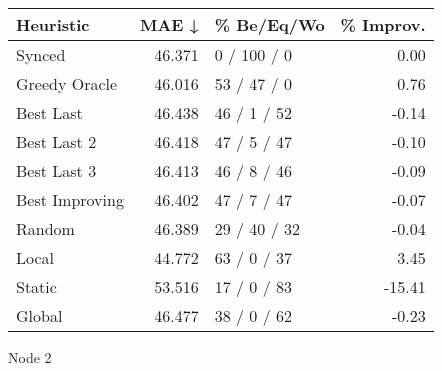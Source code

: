 \begin{tabular}{lrlr}
\toprule
\textbf{Heuristic} & \textbf{MAE ↓} & \textbf{\% Be/Eq/Wo} & \textbf{\% Improv.} \\
\midrule
            Synced &         46.371 &          0 / 100 / 0 &                0.00 \\
     Greedy Oracle &         46.016 &          53 / 47 / 0 &                0.76 \\
         Best Last &         46.438 &          46 / 1 / 52 &               -0.14 \\
       Best Last 2 &         46.418 &          47 / 5 / 47 &               -0.10 \\
       Best Last 3 &         46.413 &          46 / 8 / 46 &               -0.09 \\
    Best Improving &         46.402 &          47 / 7 / 47 &               -0.07 \\
            Random &         46.389 &         29 / 40 / 32 &               -0.04 \\
             Local &         44.772 &          63 / 0 / 37 &                3.45 \\
            Static &         53.516 &          17 / 0 / 83 &              -15.41 \\
            Global &         46.477 &          38 / 0 / 62 &               -0.23 \\
\bottomrule
\end{tabular}
\caption{Node 2}
\label{tab:non_lr01_le2_bs2_2}
